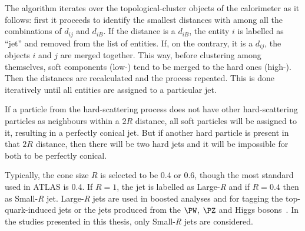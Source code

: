 The algorithm iterates over the topological-cluster objects of the calorimeter as it follows:
first it  proceeds to identify the smallest distances with among all the combinations of $d_{ij}$ and $d_{iB}$.
If the distance is a $d_{iB}$, the entity $i$ is labelled as ``jet'' and removed from the list of entities. 
If, on the contrary, it is a $d_{ij}$, the objects $i$ and $j$ are merged together.  This way, before clustering
among themselves,  soft components  (low-\pT) tend to be merged to the hard ones (high-\pT). 
Then the distances are recalculated and the process repeated. This is done iteratively until all entities are
assigned to a particular jet.

If a particle from the hard-scattering process does not have other hard-scattering particles as 
neighbours within a $2R$ distance, all soft particles will be assigned to it, 
resulting in a perfectly conical jet. But if another hard particle is present in that $2R$ distance, then there
will be two hard jets and it will be impossible for both to be perfectly conical.


Typically,  the cone size $R$ is selected to be 0.4 or 0.6, though the most standard used in ATLAS is 0.4.
If $R=1$, the jet is labelled as Large-\textit{R} and if $R=0.4$ then as Small-\textit{R} jet.
Large-\textit{R} jets are used in boosted analyses and for tagging the 
top-quark-induced jets or the jets produced from the $\PW$, $\PZ$ and Higgs bosons~\cite{ATL-PHYS-PUB-2020-017,ATLAS:2018wis}.
In the studies presented in this thesis, only Small-\textit{R} jets are considered. 




